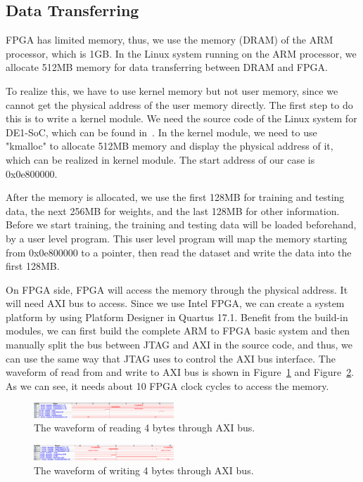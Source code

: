 \documentclass[conference]{IEEEtran}
\begin{document}
\subsection{Data Transferring}
FPGA has limited memory, thus, we use the memory (DRAM) of the ARM processor, which is 1GB. In the Linux system running on the ARM processor, we allocate 512MB memory for data transferring between DRAM and FPGA. 

To realize this, we have to use kernel memory but not user memory, since we cannot get the physical address of the user memory directly. The first step to do this is to write a kernel module. We need the source code of the Linux system for DE1-SoC, which can be found in~\cite{linux}. In the kernel module, we need to use "kmalloc" to allocate 512MB memory and display the physical address of it, which can be realized in kernel module. The start address of our case is 0x0e800000. 

After the memory is allocated, we use the first 128MB for training and testing data, the next 256MB for weights, and the last 128MB for other information. Before we start training, the training and testing data will be loaded beforehand, by a user level program. This user level program will map the memory starting from 0x0e800000 to a pointer, then read the dataset and write the data into the first 128MB.

On FPGA side, FPGA will access the memory through the physical address. It will need AXI bus to access. Since we use Intel FPGA, we can create a system platform by using Platform Designer in Quartus 17.1. Benefit from the build-in modules, we can first build the complete ARM to FPGA basic system and then manually split the bus between JTAG and AXI in the source code, and thus, we can use the same way that JTAG uses to control the AXI bus interface. The waveform of read from and write to AXI bus is shown in Figure~\ref{fig:axir} and Figure~\ref{fig:axiw}. As we can see, it needs about 10 FPGA clock cycles to access the memory. 

\begin{figure}[!hbt]
	\centering
	\includegraphics[width=0.47\textwidth]{axiread.png}
	\caption{The waveform of reading 4 bytes through AXI bus.}
	\label{fig:axir}
\end{figure}

\begin{figure}[!hbt]
	\centering
	\includegraphics[width=0.47\textwidth]{axiwrite.png}
	\caption{The waveform of writing 4 bytes through AXI bus.}
	\label{fig:axiw}
\end{figure}
\end{document}
